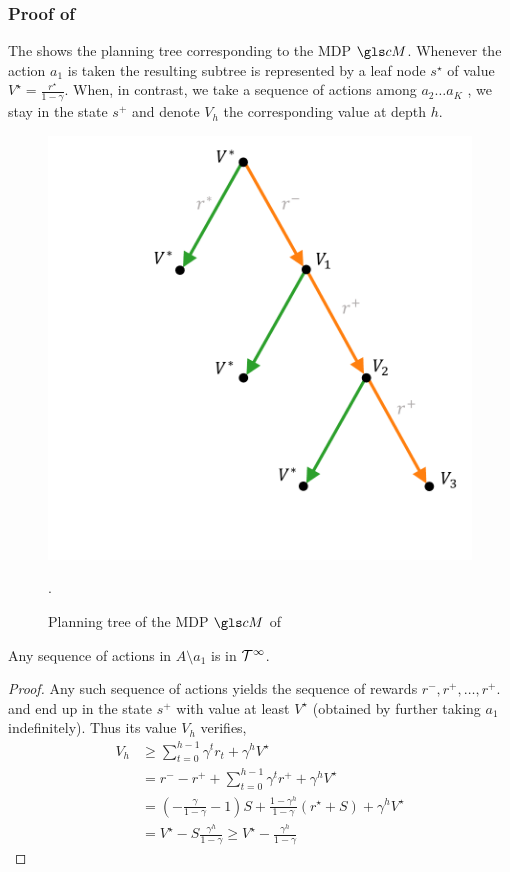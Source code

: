 \subsubsection{Proof of }
\label{sec:proof-illustrative-example}
The  shows the planning tree corresponding to the MDP $\cM$. Whenever the action $a_1$ is taken  the resulting subtree is represented by a leaf node $s^\star$ of value $V^\star = \frac{r^\star}{1-\gamma}$. When, in contrast, we take a sequence of actions among $a_2\dots a_K$ , we stay in the state $s^+$ and denote $V_h$ the corresponding value at depth $h$.

\begin{figure}
    \centering
    \includegraphics[trim={3.5cm 2cm 0.5cm 0.5cm}, clip, width=0.5\linewidth]{img/gbop/mdp_tree.pdf}
    \caption{Planning tree of the \gls{MDP} $\cM$ of }.
    \label{fig:mdp-tree}
\end{figure}
\begin{lemma}
	\begin{leftbar}[lemmabar]
 Any sequence of actions in $A\setminus{a_1}$ is in $\mathcal{T}^\infty$.
 \end{leftbar}
\end{lemma}
\begin{proof}
Any such sequence of actions yields the sequence of rewards $r^-, r^+, \dots,r^+$. and end up in the state $s^+$ with value at least $V^\star$ (obtained by further taking $a_1$ indefinitely). Thus its value $V_h$ verifies, 
\begin{align*}
    V_h &\geq \sum_{t=0}^{h-1} \gamma^t r_t + \gamma^h V^\star\\
    &= r^- - r^+ + \sum_{t=0}^{h-1} \gamma^t r^+ + \gamma^h V^\star \\
    &= (-\frac{\gamma}{1-\gamma} - 1)S + \frac{1-\gamma^h}{1-\gamma} (r^\star + S) + \gamma^h V^\star\\
    &= V^\star - S\frac{\gamma^h}{1-\gamma} \geq V^\star - \frac{\gamma^h}{1-\gamma}
\end{align*}
\end{proof}

